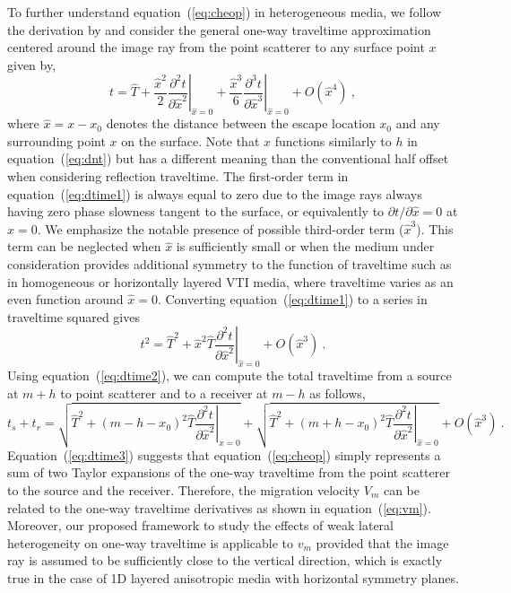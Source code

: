 To further understand equation~(\ref{eq:cheop}) in heterogeneous media, we follow the derivation by \cite{cam2007} and consider the general one-way traveltime approximation centered around the image ray from the point scatterer to any surface point $x$ given by,
\begin{equation}
\label{eq:dtime1}
t = \hat{T} + \frac{\hat{x}^2}{2} \left.\frac{\partial^2 t}{\partial \hat{x}^2}\right\rvert_{\hat{x}=0} + \frac{\hat{x}^3}{6} \left.\frac{\partial^3 t}{\partial \hat{x}^3}\right\rvert_{\hat{x}=0} + O(\hat{x}^4)~,
\end{equation}
where $\hat{x} = x-x_0$ denotes the distance between the escape location $x_0$ and any surrounding point $x$ on the surface. Note that $\hat{x}$ functions similarly to $h$ in equation~(\ref{eq:dnt}) but has a different meaning than the conventional half offset when considering reflection traveltime. The first-order term in equation~(\ref{eq:dtime1}) is always equal to zero due to the image rays always having zero phase slowness tangent to the surface, or equivalently to $\partial t/\partial \hat{x} = 0 $ at $\hat{x}=0$. We emphasize the notable presence of possible third-order term ($\hat{x}^3$). This term can be neglected when $\hat{x}$ is sufficiently small or when the medium under consideration provides additional symmetry to the function of traveltime such as in homogeneous or horizontally layered VTI media, where traveltime varies as an even function around $\hat{x}=0$. Converting equation~(\ref{eq:dtime1}) to a series in traveltime squared gives
\begin{equation}
\label{eq:dtime2}
t^2 = \hat{T}^2 + \hat{x}^2 \hat{T}\left.\frac{\partial^2 t}{\partial \hat{x}^2}\right\rvert_{\hat{x}=0} + O(\hat{x}^3)~.
\end{equation}
Using equation~(\ref{eq:dtime2}), we can compute the total traveltime from a source at $m+h$ to point scatterer and to a receiver at $m-h$ as follows,
\begin{equation}
\label{eq:dtime3}
t_s + t_r = \sqrt{\hat{T}^2 + (m-h-x_0)^2 \hat{T}\left.\frac{\partial^2 t}{\partial \hat{x}^2}\right\rvert_{\hat{x}=0}} + \sqrt{\hat{T}^2 + (m+h-x_0)^2 \hat{T}\left.\frac{\partial^2 t}{\partial \hat{x}^2}\right\rvert_{\hat{x}=0}} + O(\hat{x}^3)~.
\end{equation}
Equation~(\ref{eq:dtime3}) suggests that equation~(\ref{eq:cheop}) simply represents a sum of two Taylor expansions of the one-way traveltime from the point scatterer to the source and the receiver. Therefore, the migration velocity $V_m$ can be related to the one-way traveltime derivatives as shown in equation~(\ref{eq:vm}). Moreover, our proposed framework to study the effects of weak lateral heterogeneity on one-way traveltime is applicable to $v_m$ provided that the image ray is assumed to be sufficiently close to the vertical direction, which is exactly true in the case of 1D layered anisotropic media with horizontal symmetry planes.




